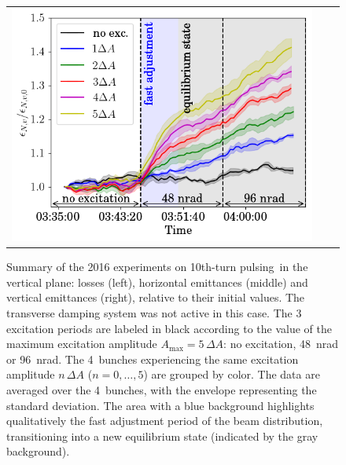 \documentclass[aps
,prstab
,reprint
,longbibliography
,preprintnumbers
,showkeys
,amsfonts,amssymb,amsmath
,floatfix
]{revtex4-1}
\newcommand{\tenthtp}{10th-turn pulsing}
\newlength{\thirdwidth}
\begin{document}
\begin{figure}
\begin{tabular}{ccc}
    \includegraphics[width=\thirdwidth]{2016_emitv_avg_rel_v10th_no_damper.png}\\
  \end{tabular}
  \caption{Summary of the 2016 experiments on \tenthtp\ in the
    vertical plane: losses (left), horizontal emittances (middle) and
    vertical emittances (right), relative to their initial values. The
    transverse damping system was not active in this case. The 3
    excitation periods are labeled in black according to the value of
    the maximum excitation amplitude
    $A_{\mathrm{max}} = 5 \, \Delta A$: no excitation, 48~nrad or
    96~nrad. The 4~bunches experiencing the same excitation amplitude
    $n \, \Delta A$ ($n = 0, \ldots, 5$) are grouped by color. The
    data are averaged over the 4~bunches, with the envelope
    representing the standard deviation. The area with a blue
    background highlights qualitatively the fast adjustment period of
    the beam distribution, transitioning into a new equilibrium state
    (indicated by the gray background).}
  \label{fig:10thexp}
\end{figure}
\end{document}
